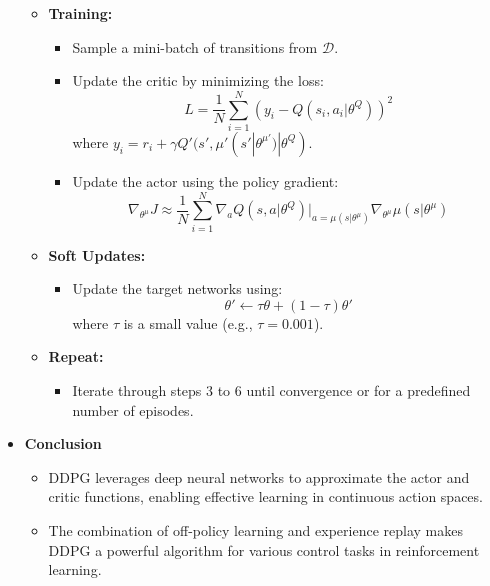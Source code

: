 \documentclass[letterpaper]{article}
\begin{document}
\begin{itemize}
\begin{itemize}
        \item \textbf{Training:}
        \begin{itemize}
            \item Sample a mini-batch of transitions from \( \mathcal{D} \).
            \item Update the critic by minimizing the loss:
            \[
            L = \frac{1}{N} \sum_{i=1}^N \left( y_i - Q(s_i, a_i|\theta^Q) \right)^2
            \]
            where \( y_i = r_i + \gamma Q'(s', \mu'(s'|\theta^{\mu'})|\theta^Q) \).
            \item Update the actor using the policy gradient:
            \[
            \nabla_{\theta^\mu} J \approx \frac{1}{N} \sum_{i=1}^N \nabla_a Q(s, a|\theta^Q) \big|_{a=\mu(s|\theta^\mu)} \nabla_{\theta^\mu} \mu(s|\theta^\mu)
            \]
        \end{itemize}

        \item \textbf{Soft Updates:}
        \begin{itemize}
            \item Update the target networks using:
            \[
            \theta' \leftarrow \tau \theta + (1 - \tau) \theta'
            \]
            where \( \tau \) is a small value (e.g., \( \tau = 0.001 \)).
        \end{itemize}

        \item \textbf{Repeat:}
        \begin{itemize}
            \item Iterate through steps 3 to 6 until convergence or for a predefined number of episodes.
        \end{itemize}
    \end{itemize}

    \item \textbf{Conclusion}
    \begin{itemize}
        \item DDPG leverages deep neural networks to approximate the actor and critic functions, enabling effective learning in continuous action spaces.
        \item The combination of off-policy learning and experience replay makes DDPG a powerful algorithm for various control tasks in reinforcement learning.
    \end{itemize}
\end{itemize}

\end{document}
